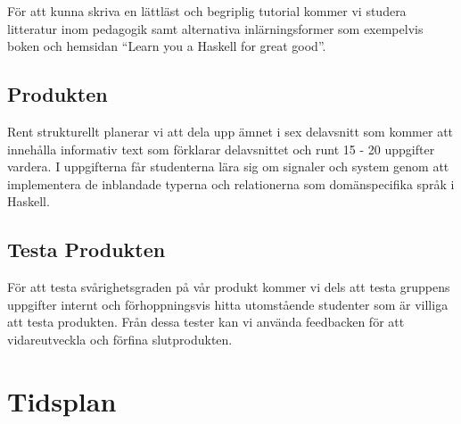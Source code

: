 \documentclass{article}
\begin{document}
För att kunna skriva en lättläst och begriplig tutorial
kommer vi studera litteratur inom pedagogik samt
alternativa inlärningsformer som exempelvis boken och
hemsidan “Learn you a Haskell for great good”.

\subsection{Produkten}
Rent strukturellt planerar vi att dela upp ämnet i
sex delavsnitt som kommer att innehålla informativ text som
förklarar delavsnittet och runt 15 - 20 uppgifter vardera.
I uppgifterna får studenterna lära sig om signaler och
system genom att implementera de inblandade typerna
och relationerna som domänspecifika språk i Haskell.

\subsection{Testa Produkten}
För att testa svårighetsgraden på vår produkt kommer vi dels att testa
gruppens uppgifter internt och förhoppningsvis hitta utomstående
studenter som är villiga att testa produkten. Från dessa tester kan vi använda feedbacken för att vidareutveckla och förfina slutprodukten.

\section{Tidsplan}
\end{document}
